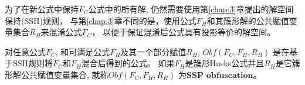 为了在新公式中保持$F_C$公式中的所有解,
仍然需要使用第\ref{chap:3}章提出的解空间保持(SSH)规则，
与第\ref{chap:3}章不同的是，使用公式$F_H$和其簇形解的公共赋值变量集合$R_H$来混淆公式$F_C$，
以便于保证混淆后公式具有投影等价的解空间。

%

\begin{definition}\label{4:OBFUSCATORSSH}
对任意公式$F_C$, 和可满足公式$F_H$及其一个部分赋值$R_H$,
$Obf(F_C,F_H,R_H)$ 是在基于SSH规则将$F_C$和$F_H$混合后得到的公式。
如果$F_H$是簇形Husks公式并且$R_H$是它簇形解公共赋值变量集合, 就称$Obf(F_C,F_H,R_H)$ 为${\textbf{SSP obfuscation}}$。
\end{definition}

